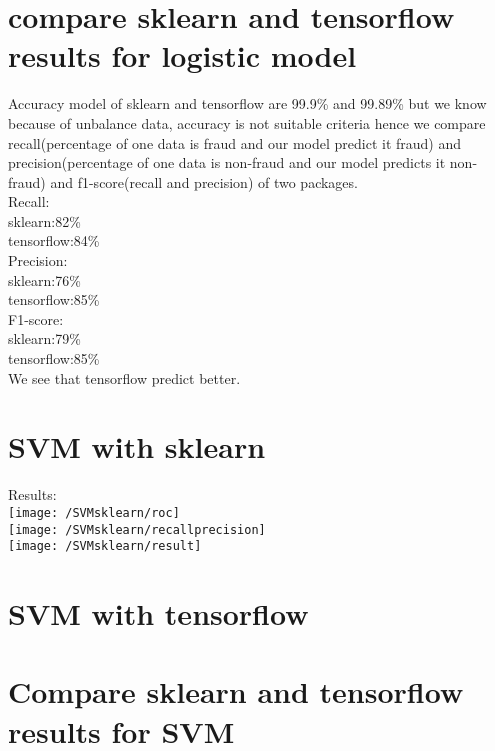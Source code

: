 \documentclass[17pt]{report}
\begin{document}
\section{compare sklearn and tensorflow results for logistic model}
Accuracy model of sklearn and tensorflow are  99.9\% and 99.89\% but we know because of unbalance data, accuracy is not suitable criteria hence we compare recall(percentage of one data is fraud and our model predict it fraud) and precision(percentage of one data is non-fraud and our model predicts it non-fraud) and f1-score(recall and precision) of two packages.\\
Recall:\\
sklearn:82\%\\
tensorflow:84\%\\
Precision:\\
sklearn:76\%\\
tensorflow:85\%\\
F1-score:\\
sklearn:79\%\\
tensorflow:85\%\\  
We see that tensorflow predict better.
\section{SVM with sklearn}

Results:\\
\texttt{[image: /SVMsklearn/roc]}\\
\texttt{[image: /SVMsklearn/recallprecision]}\\
\texttt{[image: /SVMsklearn/result]}\\

\section{SVM with tensorflow}
	
\section{Compare sklearn and tensorflow results for SVM}
\end{document}
